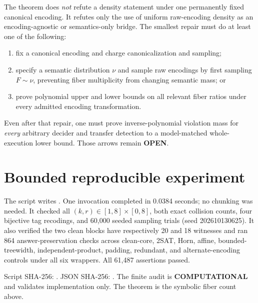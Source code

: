 \documentclass[11pt]{article}
\newcommand{\COMP}{\textbf{COMPUTATIONAL}}
\newcommand{\OPEN}{\textbf{OPEN}}
\begin{document}
The theorem does \emph{not} refute a density statement under one permanently
fixed canonical encoding. It refutes only the use of uniform raw-encoding
density as an encoding-agnostic or semantics-only bridge. The smallest repair
must do at least one of the following:
\begin{enumerate}
\item fix a canonical encoding and charge canonicalization and sampling;
\item specify a semantic distribution \(\nu\) and sample raw encodings by
first sampling \(F\sim\nu\), preventing fiber multiplicity from changing
semantic mass; or
\item prove polynomial upper and lower bounds on all relevant fiber ratios
under every admitted encoding transformation.
\end{enumerate}
Even after that repair, one must prove inverse-polynomial violation mass for
\emph{every} arbitrary decider and transfer detection to a model-matched
whole-execution lower bound. Those arrows remain \OPEN.

\section{Bounded reproducible experiment}
The script
writes
.
One invocation completed in 0.0384 seconds; no chunking was needed. It checked
all \((k,r)\in[1,8]\times[0,8]\), both exact collision counts, four bijective
tag recodings, and 60,000 seeded sampling trials (seed 202610130625). It also
verified the two clean blocks have respectively 20 and 18 witnesses and ran
864 answer-preservation checks across clean-core, 2SAT, Horn, affine,
bounded-treewidth, independent-product, padding, redundant, and
alternate-encoding controls under all six wrappers. All 61,487 assertions
passed.

Script SHA-256:
.
JSON SHA-256:
.
The finite audit is \COMP{} and validates implementation only. The theorem is
the symbolic fiber count above.
\end{document}
